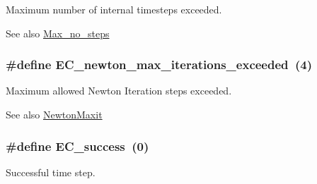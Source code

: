 Maximum number of internal timesteps exceeded. 

\begin{DoxySeeAlso}{See also}
\hyperlink{radau2a_8cu_a4f5652e996f678da1b1b93c8aa4a7961}{Max\+\_\+no\+\_\+steps} 
\end{DoxySeeAlso}
\subsubsection[{\texorpdfstring{E\+C\+\_\+newton\+\_\+max\+\_\+iterations\+\_\+exceeded}{EC_newton_max_iterations_exceeded}}]{\setlength{\rightskip}{0pt plus 5cm}\#define E\+C\+\_\+newton\+\_\+max\+\_\+iterations\+\_\+exceeded~(4)}\hypertarget{group__RK__ErrCodes_gaae2906abd9ae8a2791c2e8626ca73a32}{}\label{group__RK__ErrCodes_gaae2906abd9ae8a2791c2e8626ca73a32}


Maximum allowed Newton Iteration steps exceeded. 

\begin{DoxySeeAlso}{See also}
\hyperlink{radau2a_8cu_ab408861ee5149b85ac129cb8a3875743}{Newton\+Maxit} 
\end{DoxySeeAlso}
\subsubsection[{\texorpdfstring{E\+C\+\_\+success}{EC_success}}]{\setlength{\rightskip}{0pt plus 5cm}\#define E\+C\+\_\+success~(0)}\hypertarget{group__RK__ErrCodes_gabd83bc0f9f475a2189a4db4a08b790ca}{}\label{group__RK__ErrCodes_gabd83bc0f9f475a2189a4db4a08b790ca}


Successful time step. 

